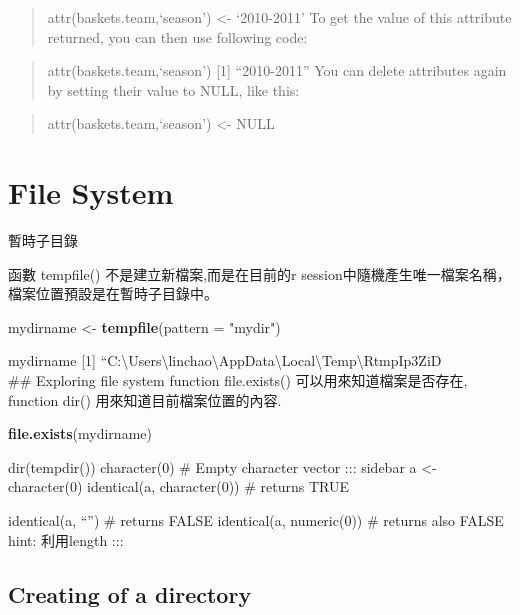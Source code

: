 \documentclass[]{book}
\newenvironment{Shaded}{\begin{snugshade}}{\end{snugshade}}
\newcommand{\KeywordTok}[1]{\textcolor[rgb]{0.13,0.29,0.53}{\textbf{#1}}}
\newcommand{\DataTypeTok}[1]{\textcolor[rgb]{0.13,0.29,0.53}{#1}}
\newcommand{\StringTok}[1]{\textcolor[rgb]{0.31,0.60,0.02}{#1}}
\newcommand{\NormalTok}[1]{#1}
\theoremstyle{definition}
\theoremstyle{definition}
\theoremstyle{definition}
\theoremstyle{remark}
\begin{document}
\begin{quote}
attr(baskets.team,`season') \textless{}- `2010-2011' To get the value of
this attribute returned, you can then use following code:
\end{quote}

\begin{quote}
attr(baskets.team,`season') {[}1{]} ``2010-2011'' You can delete
attributes again by setting their value to NULL, like this:
\end{quote}

\begin{quote}
attr(baskets.team,`season') \textless{}- NULL
\end{quote}

\chapter{File System}\label{file-system}

暫時子目錄

函數 tempfile() 不是建立新檔案,而是在目前的r
session中隨機產生唯一檔案名稱，檔案位置預設是在暫時子目錄中。

\begin{Shaded}
\begin{Highlighting}[]
\NormalTok{mydirname <-}\StringTok{ }\KeywordTok{tempfile}\NormalTok{(}\DataTypeTok{pattern =} \StringTok{"mydir"}\NormalTok{)}
\end{Highlighting}
\end{Shaded}

mydirname {[}1{]}
``C:\textbackslash{}Users\textbackslash{}linchao\textbackslash{}AppData\textbackslash{}Local\textbackslash{}Temp\textbackslash{}RtmpIp3ZiD\\
\#\# Exploring file system function file.exists()
可以用來知道檔案是否存在, function dir() 用來知道目前檔案位置的內容.

\begin{Shaded}
\begin{Highlighting}[]
\KeywordTok{file.exists}\NormalTok{(mydirname)}
\end{Highlighting}
\end{Shaded}

dir(tempdir()) character(0) \# Empty character vector ::: sidebar a
\textless{}- character(0) identical(a, character(0)) \# returns TRUE

identical(a, ``'') \# returns FALSE identical(a, numeric(0)) \# returns
also FALSE hint: 利用length :::

\section{Creating of a directory}\label{creating-of-a-directory}
\end{document}
